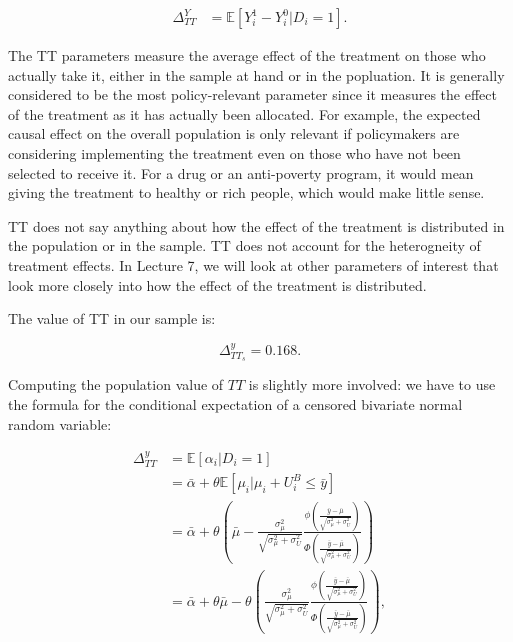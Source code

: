 \documentclass[]{book}
\newcommand{\esp}[1]{\mathbb{E}[ #1 ]}
\theoremstyle{definition}
\theoremstyle{definition}
\theoremstyle{definition}
\theoremstyle{remark}
\let\BeginKnitrBlock\begin \let\EndKnitrBlock\end
\begin{document}
\begin{align*}
  \Delta^Y_{TT} & = \esp{Y_i^1-Y_i^0|D_i=1}.
  \end{align*}

The TT parameters measure the average effect of the treatment on those
who actually take it, either in the sample at hand or in the popluation.
It is generally considered to be the most policy-relevant parameter
since it measures the effect of the treatment as it has actually been
allocated. For example, the expected causal effect on the overall
population is only relevant if policymakers are considering implementing
the treatment even on those who have not been selected to receive it.
For a drug or an anti-poverty program, it would mean giving the
treatment to healthy or rich people, which would make little sense.

TT does not say anything about how the effect of the treatment is
distributed in the population or in the sample. TT does not account for
the heterogneity of treatment effects. In Lecture 7, we will look at
other parameters of interest that look more closely into how the effect
of the treatment is distributed.

\BeginKnitrBlock{example}
\protect\hypertarget{exm:unnamed-chunk-9}{}{\label{exm:unnamed-chunk-9} }The
value of TT in our sample is:
\EndKnitrBlock{example} \[
\Delta^y_{TT_s}=0.168.
\]

Computing the population value of \(TT\) is slightly more involved: we
have to use the formula for the conditional expectation of a censored
bivariate normal random variable:

\begin{align*}
\Delta^y_{TT} & = \esp{\alpha_i|D_i=1}\\
              & = \bar{\alpha}+\theta\esp{\mu_i|\mu_i+U_i^B\leq\bar{y}}\\
              & = \bar{\alpha}+\theta\left(\bar{\mu} - \frac{\sigma^2_{\mu}}{\sqrt{\sigma^2_{\mu}+\sigma^2_{U}}}\frac{\phi\left(\frac{\bar{y}-\bar{\mu}}{\sqrt{\sigma^2_{\mu}+\sigma^2_{U}}}\right)}{\Phi\left(\frac{\bar{y}-\bar{\mu}}{\sqrt{\sigma^2_{\mu}+\sigma^2_{U}}}\right)}\right)\\
              & = \bar{\alpha}+\theta\bar{\mu}-\theta\left(\frac{\sigma^2_{\mu}}{\sqrt{\sigma^2_{\mu}+\sigma^2_{U}}}\frac{\phi\left(\frac{\bar{y}-\bar{\mu}}{\sqrt{\sigma^2_{\mu}+\sigma^2_{U}}}\right)}{\Phi\left(\frac{\bar{y}-\bar{\mu}}{\sqrt{\sigma^2_{\mu}+\sigma^2_{U}}}\right)}\right),
\end{align*}
\end{document}
